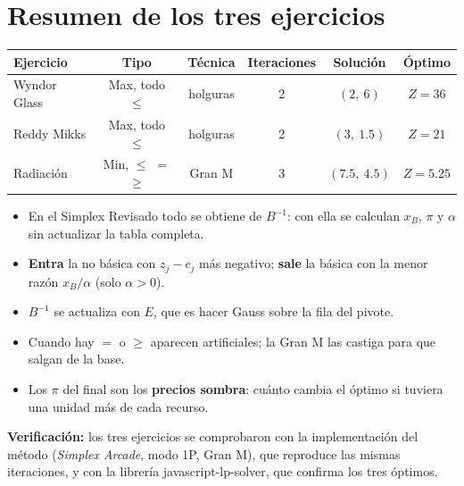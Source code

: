 \documentclass[11pt,a4paper]{article}
\newcommand{\entra}[1]{\textcolor{entra}{\textbf{#1}}}
\newcommand{\sale}[1]{\textcolor{sale}{\textbf{#1}}}
\newcommand{\Binv}{B^{-1}}
\begin{document}
\newpage
\section*{Resumen de los tres ejercicios}
\begin{center}
\begin{tabular}{lccccc}
\toprule
\textbf{Ejercicio} & \textbf{Tipo} & \textbf{Técnica} & \textbf{Iteraciones} & \textbf{Solución} & \textbf{Óptimo} \\
\midrule
Wyndor Glass & Max, todo $\le$ & holguras & 2 & $(2,\ 6)$ & $Z = 36$ \\
Reddy Mikks & Max, todo $\le$ & holguras & 2 & $(3,\ 1.5)$ & $Z = 21$ \\
Radiación & Min, $\le$ $=$ $\ge$ & Gran M & 3 & $(7.5,\ 4.5)$ & $Z = 5.25$ \\
\bottomrule
\end{tabular}
\end{center}

\begin{idea}[Conclusiones]
\begin{itemize}[itemsep=2pt, leftmargin=*]
  \item En el Simplex Revisado todo se obtiene de $\Binv$: con ella se calculan $x_B$, $\pi$ y $\alpha$ sin actualizar la tabla completa.
  \item \entra{Entra} la no básica con $z_j - c_j$ más negativo; \sale{sale} la básica con la menor razón $x_B/\alpha$ (solo $\alpha > 0$).
  \item $\Binv$ se actualiza con $E$, que es hacer Gauss sobre la fila del pivote.
  \item Cuando hay $=$ o $\ge$ aparecen artificiales; la Gran M las castiga para que salgan de la base.
  \item Los $\pi$ del final son los \textbf{precios sombra}: cuánto cambia el óptimo si tuviera una unidad más de cada recurso.
\end{itemize}
\end{idea}

\textbf{Verificación:} los tres ejercicios se comprobaron con la implementación del método (\emph{Simplex Arcade},
modo 1P, Gran M), que reproduce las mismas iteraciones, y con la librería javascript-lp-solver, que confirma los tres óptimos.
\end{document}
